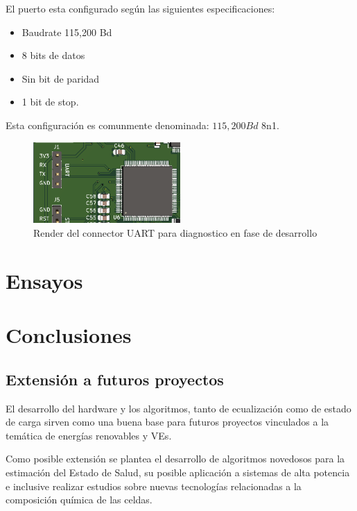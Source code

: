 \documentclass[10pt,a4paper]{article}
\begin{document}
\begin{itemize}
El puerto esta configurado según las siguientes especificaciones:
\begin{itemize}
	\item Baudrate 115,200 Bd
	\item 8 bits de datos
	\item Sin bit de paridad
	\item 1 bit de stop.
\end{itemize}

Esta configuración es comunmente denominada: $115,200 Bd$ 8n1.

\begin{figure}[h!]
	\begin{center}
		\includegraphics[width=0.5\textwidth]{connector_UART.png}
		\caption{Render del connector UART para diagnostico en fase de desarrollo}
		\label{UART_Connector}
	\end{center}
\end{figure}
\FloatBarrier



\clearpage

\section{Ensayos}\label{ensayos}


\newpage

\section{Conclusiones}\label{conclusiones}

\subsection{Extensión a futuros proyectos}

El desarrollo del hardware y los algoritmos, tanto de ecualización como de
estado de carga sirven como una buena base para futuros proyectos vinculados a
la temática de energías renovables y \acrshort{VE}s.

Como posible extensión se plantea el desarrollo de algoritmos novedosos para la
estimación del Estado de Salud, su posible aplicación a sistemas de alta
potencia e inclusive realizar estudios sobre nuevas tecnologías relacionadas a
la composición química de las celdas.


\end{itemize}
\end{document}
